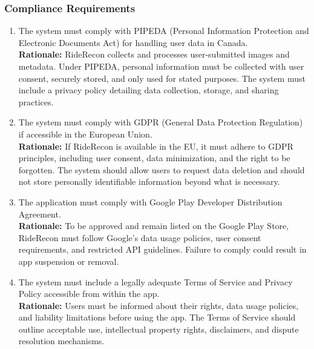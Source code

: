 \documentclass[]{article}
\begin{document}
\subsubsection{Compliance Requirements}
\label{ssub:compliance_requirements}
\begin{enumerate}[label={LR-COMP\arabic*.}]
    \item The system must comply with PIPEDA (Personal Information Protection and Electronic Documents Act) for handling user data in Canada.\\
   \textbf{Rationale:} RideRecon collects and processes user-submitted images and metadata. Under PIPEDA, personal information must be collected with user consent, securely stored, and only used for stated purposes. The system must include a privacy policy detailing data collection, storage, and sharing practices.
   \item The system must comply with GDPR (General Data Protection Regulation) if accessible in the European Union.\\
   \textbf{Rationale:} If RideRecon is available in the EU, it must adhere to GDPR principles, including user consent, data minimization, and the right to be forgotten. The system should allow users to request data deletion and should not store personally identifiable information beyond what is necessary.
   \item The application must comply with Google Play Developer Distribution Agreement.\\
   \textbf{Rationale:} To be approved and remain listed on the Google Play Store, RideRecon must follow Google’s data usage policies, user consent requirements, and restricted API guidelines. Failure to comply could result in app suspension or removal.
   \item The system must include a legally adequate Terms of Service and Privacy Policy accessible from within the app.\\
   \textbf{Rationale:} Users must be informed about their rights, data usage policies, and liability limitations before using the app. The Terms of Service should outline acceptable use, intellectual property rights, disclaimers, and dispute resolution mechanisms. 
\end{enumerate}
\end{document}

